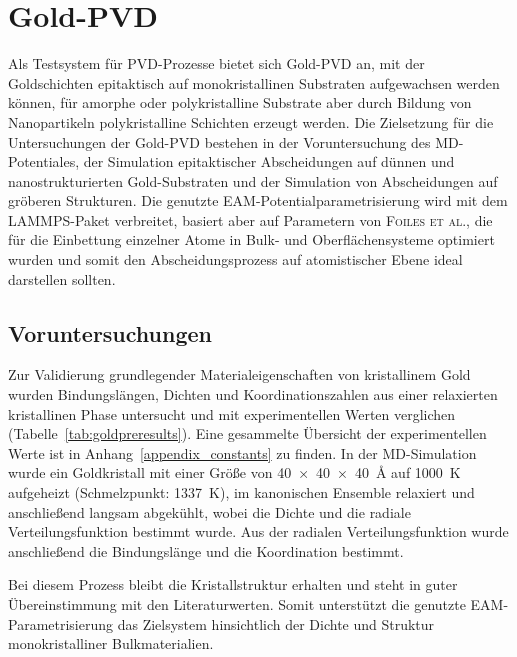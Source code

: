 \section{Gold-PVD}
\label{goldpvd}


Als Testsystem für PVD-Prozesse bietet sich Gold-PVD an, mit der Goldschichten epitaktisch auf monokristallinen Substraten aufgewachsen werden können\cite{gottsche_uber_1956}, für amorphe oder polykristalline Substrate aber durch Bildung von Nanopartikeln polykristalline Schichten erzeugt werden\cite{svorcik_annealing_2011}.
Die Zielsetzung für die Untersuchungen der Gold-PVD bestehen in der Voruntersuchung des MD-Potentiales, der Simulation epitaktischer Abscheidungen auf dünnen und nanostrukturierten Gold-Substraten und der Simulation von Abscheidungen auf gröberen Strukturen.
Die genutzte EAM-Potentialparametrisierung wird mit dem LAMMPS-Paket\cite{plimpton_lammps_2014} verbreitet, basiert aber auf Parametern von \textsc{Foiles et al.}\cite{foiles_embedded-atom-method_1986}, die für die Einbettung einzelner Atome in Bulk- und Oberflächensysteme optimiert wurden und somit den Abscheidungsprozess auf atomistischer Ebene ideal darstellen sollten.

\subsection{Voruntersuchungen}
\label{goldpreparation}

Zur Validierung grundlegender Materialeigenschaften von kristallinem Gold wurden Bindungslängen, Dichten und Koordinationszahlen aus einer relaxierten kristallinen Phase untersucht und mit experimentellen Werten\cite{haynes_crc_2011} verglichen (Tabelle~\ref{tab:goldpreresults}).
Eine gesammelte Übersicht der experimentellen Werte ist in Anhang~\ref{appendix_constants} zu finden.
In der MD-Simulation wurde ein Goldkristall mit einer Größe von \SI{40x40x40}{\angstrom} auf \SI{1000}{\kelvin} aufgeheizt (Schmelzpunkt: \SI{1337}{\kelvin}), im kanonischen Ensemble relaxiert und anschließend langsam abgekühlt, wobei die Dichte und die radiale Verteilungsfunktion bestimmt wurde.
Aus der radialen Verteilungsfunktion wurde anschließend die Bindungslänge und die Koordination bestimmt.

Bei diesem Prozess bleibt die Kristallstruktur erhalten und steht in guter Übereinstimmung mit den Literaturwerten.
Somit unterstützt die genutzte EAM-Para\-metri\-sierung das Zielsystem hinsichtlich der Dichte und Struktur monokristalliner Bulkmaterialien.

